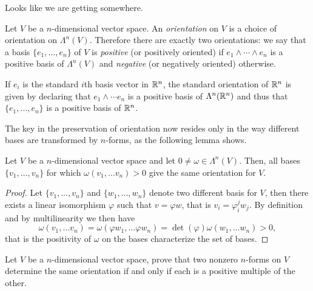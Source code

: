 Looks like we are getting somewhere.

\begin{definition}
  Let $V$ be a $n$-dimensional vector space.
  An \emph{orientation} on $V$ is a choice of orientation on $\Lambda^n(V)$.
  Therefore there are exactly two orientations: we say that a basis $\{e_1,\ldots,e_n\}$ of $V$ is \emph{positive} (or positively oriented) if $e_1\wedge\cdots\wedge e_n$ is a positive basis of $\Lambda^n(V)$ and \emph{negative} (or negatively oriented) otherwise.
\end{definition}

\begin{example}
  If $e_i$ is the standard $i$th basis vector in $\mathbb{R}^n$, the standard orientation of $\mathbb{R}^n$ is given by declaring that $e_1\wedge\cdots e_n$ is a positive basis of $\Lambda^n(\mathbb{R}^n)$ and thus that $\{e_1,\ldots,e_n\}$ is a positive basis of $\mathbb{R}^n$.
\end{example}

The key in the preservation of orientation now resides only in the way different bases are transformed by $n$-forms, as the following lemma shows.

\begin{lemma}\label{lemma:orient}
  Let $V$ be a $n$-dimensional vector space and let $0\neq \omega\in\Lambda^n(V)$.
  Then, all bases $\{v_1, \ldots, v_n\}$ for which $\omega(v_1,\ldots v_n) > 0$ give the same orientation for $V$.
\end{lemma}
\begin{proof}
  Let $\{v_1, \ldots, v_n\}$ and $\{w_1, \ldots, w_n\}$ denote two different basis for $V$, then there exists a linear isomorphism $\varphi$ such that $v = \varphi w$, that is $v_i = \varphi_{i}^j w_j$.
  By definition and by multilinearity we then have
  \begin{equation}\label{eq:posorie}
    \omega(v_1,\ldots v_n) = \omega(\varphi w_1,\ldots \varphi w_n) = \det(\varphi)\omega(w_1,\ldots w_n) > 0,
  \end{equation} that is the positivity of $\omega$ on the bases characterize the set of bases.
\end{proof}

\begin{exercise}
  Let $V$ be a $n$-dimensional vector space, prove that two nonzero $n$-forms on $V$ determine the same orientation if and only if each is a positive multiple of the other.
\end{exercise}

